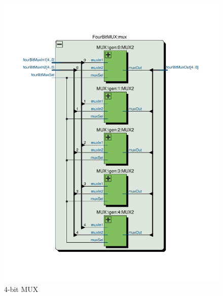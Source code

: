 \documentclass[13pt,a4paper]{report}
\begin{document}
\begin{figure}[H]
\centering
\includegraphics[scale=0.6, clip, trim={0cm 3cm 0cm 3.5cm}]{images/Exc2_FourBitMUX_RTL.pdf}
\caption*{4-bit MUX}
\end{figure}
\end{document}
